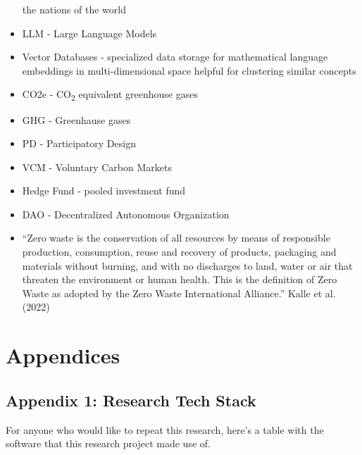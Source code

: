 \documentclass[
  letterpaper,
  DIV=11,
  numbers=noendperiod]{scrartcl}
\begin{document}
\begin{itemize}
  the nations of the world
\item
  LLM - Large Language Models
\item
  Vector Databases - specialized data storage for mathematical language
  embeddings in multi-dimensional space helpful for clustering similar
  concepts
\item
  CO2e - CO\textsubscript{2} equivalent greenhouse gases
\item
  GHG - Greenhause gases
\item
  PD - Participatory Design
\item
  VCM - Voluntary Carbon Markets
\item
  Hedge Fund - pooled investment fund
\item
  DAO - Decentralized Autonomous Organization
\item
  ``Zero waste is the conservation of all resources by means of
  responsible production, consumption, reuse and recovery of products,
  packaging and materials without burning, and with no discharges to
  land, water or air that threaten the environment or human health. This
  is the definition of Zero Waste as adopted by the Zero Waste
  International Alliance.'' Kalle et al. (2022)
\end{itemize}

\newpage

\section{Appendices}\label{appendices}

\subsection{Appendix 1: Research Tech
Stack}\label{appendix-1-research-tech-stack}

For anyone who would like to repeat this research, here's a table with
the software that this research project made use of.
\end{document}
